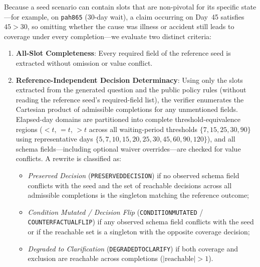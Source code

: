 \documentclass[10pt,twocolumn]{article}
\renewcommand{\_}{\textunderscore\allowbreak}
\begin{document}
Because a seed scenario can contain slots that are non-pivotal for its specific state---for example, on \texttt{pa\_h865} (30-day wait), a claim occurring on Day~45 satisfies $45 > 30$, so omitting whether the cause was illness or accident still leads to coverage under every completion---we evaluate two distinct criteria:
\begin{enumerate}[leftmargin=*,nosep]
  \item \textbf{All-Slot Completeness}: Every required field of the reference seed is extracted without omission or value conflict.
  \item \textbf{Reference-Independent Decision Determinacy}: Using only the slots extracted from the generated question and the public policy rules (without reading the reference seed's required-field list), the verifier enumerates the Cartesian product of admissible completions for any unmentioned fields. Elapsed-day domains are partitioned into complete threshold-equivalence regions ($< t$, $= t$, $> t$ across all waiting-period thresholds $\{7, 15, 25, 30, 90\}$ using representative days $\{5, 7, 10, 15, 20, 25, 30, 45, 60, 90, 120\}$), and all schema fields---including optional waiver overrides---are checked for value conflicts. A rewrite is classified as:
  \begin{itemize}[leftmargin=*,nosep]
    \item \emph{Preserved Decision} (\texttt{PRESERVED\_DECISION}) if no observed schema field conflicts with the seed and the set of reachable decisions across all admissible completions is the singleton matching the reference outcome;
    \item \emph{Condition Mutated / Decision Flip} (\texttt{CONDITION\_MUTATED} / \texttt{COUNTERFACTUAL\_FLIP}) if any observed schema field conflicts with the seed or if the reachable set is a singleton with the opposite coverage decision;
    \item \emph{Degraded to Clarification} (\texttt{DEGRADED\_TO\_CLARIFY}) if both coverage and exclusion are reachable across completions ($|\text{reachable}| > 1$).
  \end{itemize}
\end{enumerate}
\end{document}
